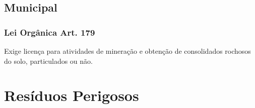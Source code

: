 \begin{subapend}
	\subsection{Municipal}
	\begin{subsubapend}
		\subsubsection{Lei Orgânica Art. 179}
		Exige licença para atividades de mineração e obtenção de consolidados rochosos do solo, particulados ou não.
	\end{subsubapend}
\end{subapend}

\section{Resíduos Perigosos}

